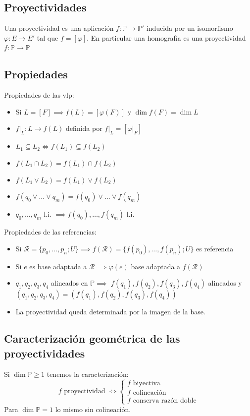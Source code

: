 \documentclass[leqno]{article}
\newcommand{\R}{\mathcal{R}}
\renewcommand{\phi}{\varphi}
\renewcommand{\P}{\mathbb{P}}
\begin{document}
\subsection{Proyectividades}
Una proyectividad es una aplicación $f:\P \to \P'$ inducida por un isomorfismo  $\varphi:E\to E'$ tal que  $f=[\varphi]$. En particular una homografía es una proyectividad $f:\P\to \P$

\subsection{Propiedades}
Propiedades de las vlp:
\begin{itemize}
    \item Si $L = [F] \implies f(L) =  [\phi(F)]$ y $\dim f(F) = \dim L$
    \item $f|_L: L\to f(L)$ definida por $f|_L = [\phi|_F]$
    \item $L_1\subseteq L_2 \iff f(L_1) \subseteq f(L_2)$
    \item $f(L_1\cap L_2) = f(L_1)\cap f(L_2)$
    \item $f(L_1\vee L_2) = f(L_1)\vee f(L_2)$
    \item $f(q_0\vee \ldots \vee q_m) = f(q_0)\vee \ldots \vee f(q_m)$
    \item $q_0, \ldots, q_m$ l.i. $\implies f(q_0), \ldots, f(q_m)$ l.i.
\end{itemize}
Propiedades de las referencias:
\begin{itemize}
    \item Si $\R = \{p_0, \ldots, p_n; U\} \implies f(\R)=\{f(p_0), \ldots, f(p_n); U\}$ es referencia
	\item Si $e$ es base adaptada a $\mathcal{R} \implies \phi(e)$ base adaptada a $f(\mathcal{R})$ 
	\item $q_1, q_2, q_3, q_4$ alineados en $\P \implies$ $f(q_1), f(q_2), f(q_3), f(q_4)$ alineados y $(q_1, q_2, q_3, q_4) = (f(q_1), f(q_2), f(q_3), f(q_4))$
	\item La proyectividad queda determinada por la imagen de la base.
\end{itemize}

\subsection{Caracterización geométrica de las proyectividades}
Si $\dim\P\ge 1$ tenemos la caracterización:
\[
  f \text{ proyectividad } \iff \begin{cases}
  f \text{ biyectiva} \\
  f \text{ colineación} \\
  f \text{ conserva razón doble}
\end{cases}
\]
Para $\dim \P = 1$ lo mismo sin colineación.
\end{document}
